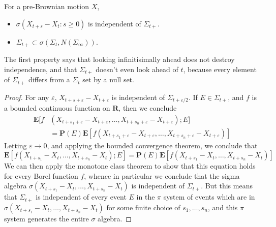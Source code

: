 \begin{theorem}
    For a pre-Brownian motion $X$,
    \begin{itemize}
        \item $\sigma(X_{t + s} - X_t: s \geq 0)$ is independent of $\Sigma_{t+}$.
        \item $\Sigma_{t+} \subset \sigma(\Sigma_t, N(\Sigma_\infty))$.
    \end{itemize}
    The first property says that looking infinitisimally ahead does not destroy independence, and that $\Sigma_{t+}$ doesn't even look ahead of $t$, because every element of $\Sigma_{t+}$ differs from a $\Sigma_t$ set by a null set.
\end{theorem}
\begin{proof}
    For any $\varepsilon$, $X_{t+s+\varepsilon} - X_{t+\varepsilon}$ is independent of $\Sigma_{t + \varepsilon/2}$. If $E \in \Sigma_{t+}$, and $f$ is a bounded continuous function on $\mathbf{R}$, then we conclude
    \begin{align*}
        \mathbf{E}[f&(X_{t+s_1+\varepsilon} - X_{t+\varepsilon}, \dots, X_{t+s_n+\varepsilon} - X_{t+\varepsilon});E]\\
        &= \mathbf{P}(E) \mathbf{E}[f(X_{t+s_1+\varepsilon} - X_{t+\varepsilon}, \dots, X_{t+s_n+\varepsilon} - X_{t+\varepsilon})]
    \end{align*}
    Letting $\varepsilon \to 0$, and applying the bounded convergence theorem, we conclude that
    \[ \mathbf{E}[f(X_{t+s_1} - X_t, \dots, X_{t+s_n} - X_t);E] = \mathbf{P}(E) \mathbf{E}[f(X_{t + s_1} - X_t, \dots, X_{t+s_n} - X_t)] \]
    We can then apply the monotone class theorem to show that this equation holds for every Borel function $f$, whence in particular we conclude that the sigma algebra $\sigma(X_{t+s_1} - X_t, \dots, X_{t+s_n} - X_t)$ is independent of $\Sigma_{t+}$. But this means that $\Sigma_{t+}$ is independent of every event $E$ in the $\pi$ system of events which are in $\sigma(X_{t+s_1} - X_t, \dots, X_{t+s_n} - X_t)$ for some finite choice of $s_1, \dots, s_n$, and this $\pi$ system generates the entire $\sigma$ algebra.


\end{proof}
